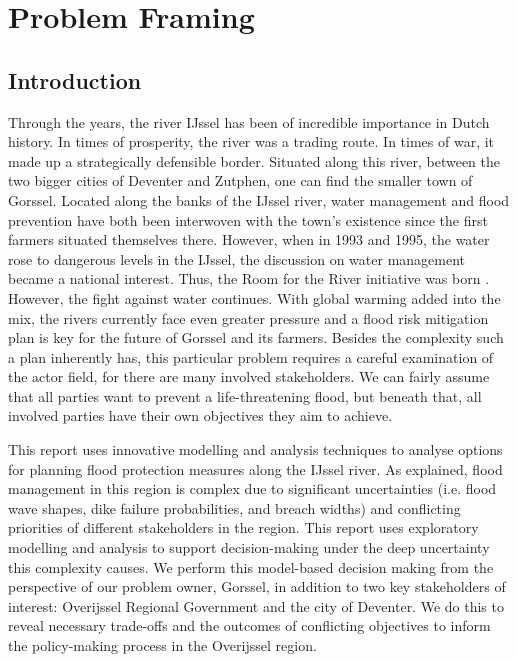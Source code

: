 \section{Problem Framing}
\label{s:prob_frame}
\subsection{Introduction}
Through the years, the river IJssel has been of incredible importance in Dutch history. In times of prosperity, the river was a trading route. In times of war, it made up a strategically defensible border. Situated along this river, between the two bigger cities of Deventer and Zutphen, one can find the smaller town of Gorssel. Located along the banks of the IJssel river, water management and flood prevention have both been interwoven with the town's existence since the first farmers situated themselves there. However, when in 1993 and 1995, the water rose to dangerous levels in the IJssel, the discussion on water management became a national interest. Thus, the Room for the River initiative was born \parencite{rijke_room_2012}. However, the fight against water continues. With global warming added into the mix, the rivers currently face even greater pressure \parencite{takken_wegen_2009} and a flood risk mitigation plan is key for the future of Gorssel and its farmers. Besides the complexity such a plan inherently has, this particular problem requires a careful examination of the actor field, for there are many involved stakeholders. We can fairly assume that all parties want to prevent a life-threatening flood, but beneath that, all involved parties have their own objectives they aim to achieve.  

This report uses innovative modelling and analysis techniques to analyse options for planning flood protection measures along the IJssel river. As explained, flood management in this region is complex due to significant uncertainties (i.e. flood wave shapes, dike failure probabilities, and breach widths) and conflicting priorities of different stakeholders in the region. This report uses exploratory modelling and analysis to support decision-making under the deep uncertainty this complexity causes. We perform this model-based decision making from the perspective of our problem owner, Gorssel, in addition to two key stakeholders of interest: Overijssel Regional Government and the city of Deventer. We do this to reveal necessary trade-offs and the outcomes of conflicting objectives to inform the policy-making process in the Overijssel region.

